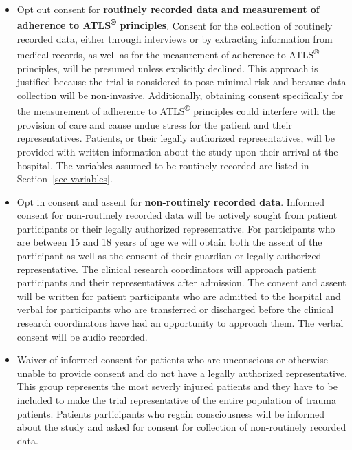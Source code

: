 \documentclass[
]{scrartcl}
\providecommand{\tightlist}{%
  \setlength{\itemsep}{0pt}\setlength{\parskip}{0pt}}\usepackage{longtable,booktabs,array}
\begin{document}
\begin{itemize}
\tightlist
\item
  Opt out consent for \textbf{routinely recorded data and measurement of
  adherence to ATLS\textsuperscript{®} principles}. Consent for the
  collection of routinely recorded data, either through interviews or by
  extracting information from medical records, as well as for the
  measurement of adherence to ATLS\textsuperscript{®} principles, will
  be presumed unless explicitly declined. This approach is justified
  because the trial is considered to pose minimal risk and because data
  collection will be non-invasive. Additionally, obtaining consent
  specifically for the measurement of adherence to
  ATLS\textsuperscript{®} principles could interfere with the provision
  of care and cause undue stress for the patient and their
  representatives. Patients, or their legally authorized
  representatives, will be provided with written information about the
  study upon their arrival at the hospital. The variables assumed to be
  routinely recorded are listed in Section~\ref{sec-variables}.
\item
  Opt in consent and assent for \textbf{non-routinely recorded data}.
  Informed consent for non-routinely recorded data will be actively
  sought from patient participants or their legally authorized
  representative. For participants who are between 15 and 18 years of
  age we will obtain both the assent of the participant as well as the
  consent of their guardian or legally authorized representative. The
  clinical research coordinators will approach patient participants and
  their representatives after admission. The consent and assent will be
  written for patient participants who are admitted to the hospital and
  verbal for participants who are transferred or discharged before the
  clinical research coordinators have had an opportunity to approach
  them. The verbal consent will be audio recorded.
\item
  Waiver of informed consent for patients who are unconscious or
  otherwise unable to provide consent and do not have a legally
  authorized representative. This group represents the most severly
  injured patients and they have to be included to make the trial
  representative of the entire population of trauma patients. Patients
  participants who regain consciousness will be informed about the study
  and asked for consent for collection of non-routinely recorded data.
\end{itemize}
\end{document}
